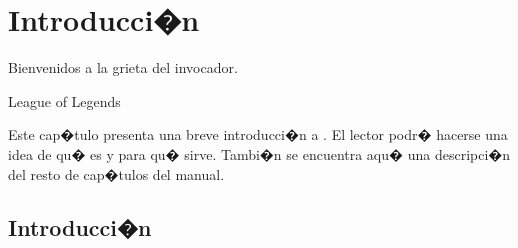 %
%
%
%
%
%
%
%
%
%

\chapter{Introducci�n}

\begin{FraseCelebre}
\begin{Frase}
Bienvenidos a la grieta del invocador.
\end{Frase}
\begin{Fuente}
League of Legends
\end{Fuente}
\end{FraseCelebre}

\begin{resumen}
  Este cap�tulo presenta una breve introducci�n a \texis.  El
  lector podr� hacerse una idea de qu� es y para qu� sirve. Tambi�n se
  encuentra aqu� una descripci�n del resto de cap�tulos del manual.
\end{resumen}


\section{Introducci�n}
\label{cap1:sec:introduccion}


